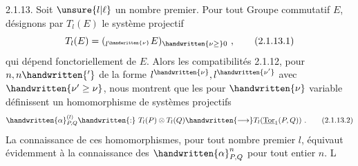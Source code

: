 2.1.13. Soit $\unsure{l|\ell}$ un nombre premier. Pour tout Groupe commutatif $E$, désignons par $T_l(E)$ le système projectif 
\[
T_l(E)=({}_{l^{\handwritten{\nu}}}E)_{\handwritten{\nu\geq}0}\ ,\tag*{(2.1.13.1)}
\]
qui dépend  fonctoriellement de $E$. Alors les compatibilités 2.1.12, pour $n,n\handwritten{'}$ de la forme $l^{\handwritten{\nu}},l^{\handwritten{\nu'}}$ avec $\handwritten{\nu'\geq\nu}$, nous montrent que les
 pour $\handwritten{\nu}$ variable définissent un homomorphisme de systèmes projectifs\handwritten{,} 
\[
\handwritten{\alpha}^{(l)}_{P,Q}\handwritten{:}\ T_l(P)\otimes T_l(Q)\handwritten{\longrightarrow}T_l(\underline{\mathrm{Tor}}_1(P,Q))\ .\tag*{(2.1.13.2)}
\]
La connaissance de ces homomorphismes, pour tout nombre premier $l$, équivaut évidemment à la connaissance des $\handwritten{\alpha}_{P,Q}^n$ pour tout entier $n$. L
